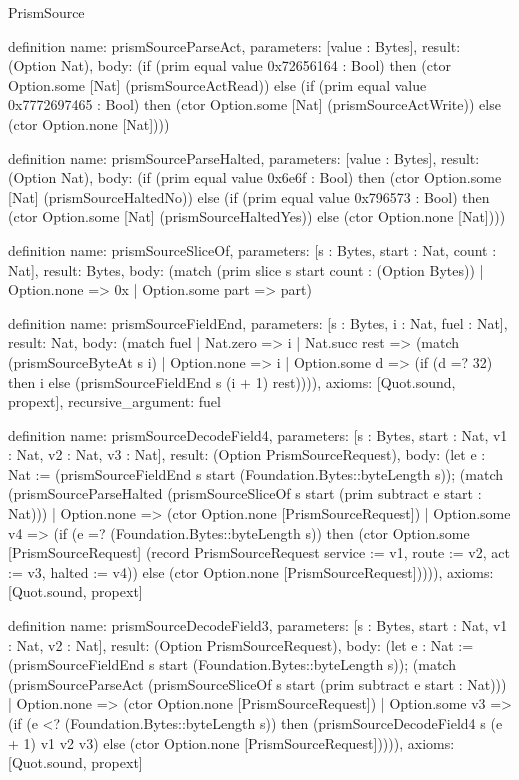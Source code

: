 \begin{lexlean}{PrismSource}
\begin{semanticmodule}
definition{
  name: prismSourceParseAct,
  parameters: [value : Bytes],
  result: (Option Nat),
  body: (if (prim equal value 0x72656164 : Bool) then (ctor Option.some [Nat] (prismSourceActRead)) else (if (prim equal value 0x7772697465 : Bool) then (ctor Option.some [Nat] (prismSourceActWrite)) else (ctor Option.none [Nat])))
}

definition{
  name: prismSourceParseHalted,
  parameters: [value : Bytes],
  result: (Option Nat),
  body: (if (prim equal value 0x6e6f : Bool) then (ctor Option.some [Nat] (prismSourceHaltedNo)) else (if (prim equal value 0x796573 : Bool) then (ctor Option.some [Nat] (prismSourceHaltedYes)) else (ctor Option.none [Nat])))
}

definition{
  name: prismSourceSliceOf,
  parameters: [s : Bytes, start : Nat, count : Nat],
  result: Bytes,
  body: (match (prim slice s start count : (Option Bytes))
    | Option.none => 0x
    | Option.some part => part)
}

definition{
  name: prismSourceFieldEnd,
  parameters: [s : Bytes, i : Nat, fuel : Nat],
  result: Nat,
  body: (match fuel
    | Nat.zero => i
    | Nat.succ rest => (match (prismSourceByteAt s i)
      | Option.none => i
      | Option.some d => (if (d =? 32) then i else (prismSourceFieldEnd s (i + 1) rest)))),
  axioms: [Quot.sound, propext],
  recursive_argument: fuel
}

definition{
  name: prismSourceDecodeField4,
  parameters: [s : Bytes, start : Nat, v1 : Nat, v2 : Nat, v3 : Nat],
  result: (Option PrismSourceRequest),
  body: (let e : Nat := (prismSourceFieldEnd s start (Foundation.Bytes::byteLength s)); (match (prismSourceParseHalted (prismSourceSliceOf s start (prim subtract e start : Nat)))
    | Option.none => (ctor Option.none [PrismSourceRequest])
    | Option.some v4 => (if (e =? (Foundation.Bytes::byteLength s)) then (ctor Option.some [PrismSourceRequest] (record PrismSourceRequest {service := v1, route := v2, act := v3, halted := v4})) else (ctor Option.none [PrismSourceRequest])))),
  axioms: [Quot.sound, propext]
}

definition{
  name: prismSourceDecodeField3,
  parameters: [s : Bytes, start : Nat, v1 : Nat, v2 : Nat],
  result: (Option PrismSourceRequest),
  body: (let e : Nat := (prismSourceFieldEnd s start (Foundation.Bytes::byteLength s)); (match (prismSourceParseAct (prismSourceSliceOf s start (prim subtract e start : Nat)))
    | Option.none => (ctor Option.none [PrismSourceRequest])
    | Option.some v3 => (if (e <? (Foundation.Bytes::byteLength s)) then (prismSourceDecodeField4 s (e + 1) v1 v2 v3) else (ctor Option.none [PrismSourceRequest])))),
  axioms: [Quot.sound, propext]
}


\end{semanticmodule}
\end{lexlean}
